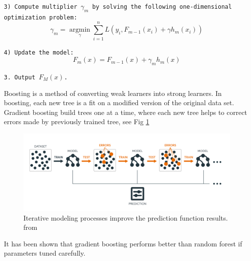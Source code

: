 \documentclass[11pt, a4paper, leqno]{article}
\begin{document}
\hspace*{20mm}\texttt{3) Compute multiplier $\gamma _{m}$ by solving the following one-dimensional\\\hspace*{34mm}optimization problem:}
\begin{equation}
\gamma_m=\operatorname*{argmin}_\gamma\sum_{i=1}^{n}L(y_i,F_{m-1}(x_i)+\gamma h_m(x_i))
\end{equation}

\hspace*{20mm}\texttt{4) Update the model:}
\begin{equation}
F_m(x)=F_{m-1}(x)+\gamma_mh_m(x)
\end{equation}

\hspace*{6mm}\texttt{3. Output $F_{M}(x)$.}

Boosting is a method of converting weak learners into strong learners. In boosting, each new tree is a fit on a modified version of the original data set. Gradient boosting build trees one at a time, where each new tree helps to correct errors made by previously trained tree, see Fig \ref{fig:Boosted Trees}
\begin{figure}[ht]
\centering
\includegraphics[width=0.9\columnwidth]{formulas/boosted-trees-process.png}
\caption{Iterative modeling processes improve the prediction function results. from \cite{Diogo:2018:Online}}
\label{fig:Boosted Trees}
\end{figure}
It has been shown that gradient boosting performs better than random forest if parameters tuned carefully.
\end{document}
